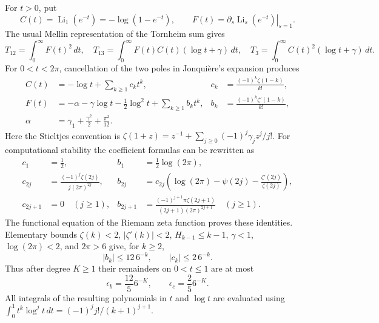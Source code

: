 For $t>0$, put
\[
 C(t)=\operatorname{Li}_1(e^{-t})=-\log(1-e^{-t}),\qquad
 F(t)=\left.\partial_s\operatorname{Li}_s(e^{-t})\right|_{s=1}.
\]
The usual Mellin representation of the Tornheim sum gives
\begin{equation}\label{cubic:mellinpartials}
 T_{12}=\int_0^\infty F(t)^2\,dt,\quad
 T_{13}=\int_0^\infty F(t)C(t)(\log t+\gamma)\,dt,\quad
 T_3=\int_0^\infty C(t)^2(\log t+\gamma)\,dt.
\end{equation}
For $0<t<2\pi$, cancellation of the two poles in Jonqui\`ere's expansion
produces
\begin{align*}
 C(t)&=-\log t+\sum_{k\ge1}c_kt^k,
 &c_k&=\frac{(-1)^k\zeta(1-k)}{k!},\\
 F(t)&=-\alpha-\gamma\log t-\tfrac12\log^2t+\sum_{k\ge1}b_kt^k,
 &b_k&=\frac{(-1)^k\zeta'(1-k)}{k!},\\
 \alpha&=\gamma_1+\frac{\gamma^2}2+\frac{\pi^2}{12}.
\end{align*}
Here the Stieltjes convention is
$\zeta(1+z)=z^{-1}+\sum_{j\ge0}(-1)^j\gamma_jz^j/j!$.
For computational stability the coefficient formulas can be rewritten as
\begin{align*}
 c_1&=\tfrac12,&b_1&=\tfrac12\log(2\pi),\\
 c_{2j}&=\frac{(-1)^j\zeta(2j)}{j(2\pi)^{2j}},&
 b_{2j}&=c_{2j}\left(\log(2\pi)-\psi(2j)-\frac{\zeta'(2j)}{\zeta(2j)}\right),\\
 c_{2j+1}&=0\quad(j\ge1),&
 b_{2j+1}&=\frac{(-1)^{j+1}\pi\zeta(2j+1)}{(2j+1)(2\pi)^{2j+1}}
 \quad(j\ge1).
\end{align*}
The functional equation of the Riemann zeta function proves these identities.
Elementary bounds $\zeta(k)<2$, $|\zeta'(k)|<2$, $H_{k-1}\le k-1$,
$\gamma<1$, $\log(2\pi)<2$, and $2\pi>6$ give, for $k\ge2$,
\[
 |b_k|\le12\,6^{-k},\qquad |c_k|\le2\,6^{-k}.
\]
Thus after degree $K\ge1$ their remainders on $0<t\le1$ are at most
\[
 \epsilon_b=\frac{12}{5}6^{-K},\qquad
 \epsilon_c=\frac25 6^{-K}.
\]
All integrals of the resulting polynomials in $t$ and $\log t$ are evaluated
using $\int_0^1t^k\log^jt\,dt=(-1)^jj!/(k+1)^{j+1}$.

